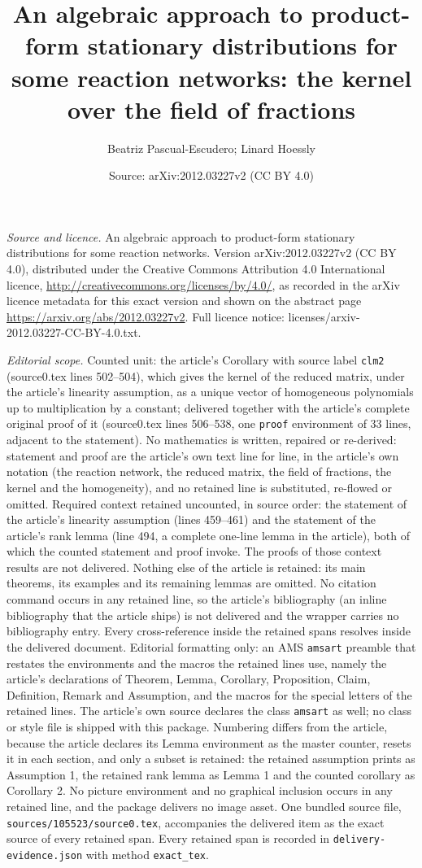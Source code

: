 \documentclass[10pt,a4paper]{amsart}
\title[An algebraic approach to product-form ]{An algebraic approach to product-form stationary distributions for some reaction networks: the kernel over the field of fractions}
\author{Beatriz Pascual-Escudero; Linard Hoessly}
\date{Source: arXiv:2012.03227v2 (CC BY 4.0)}
\theoremstyle{plain}
\theoremstyle{definition}
\theoremstyle{remark}
\begin{document}
\maketitle
\noindent\emph{Source and licence.} An algebraic approach to product-form stationary distributions for some reaction networks. Version arXiv:2012.03227v2 (CC BY 4.0), distributed under the Creative Commons Attribution 4.0 International licence, \url{http://creativecommons.org/licenses/by/4.0/}, as recorded in the arXiv licence metadata for this exact version and shown on the abstract page \url{https://arxiv.org/abs/2012.03227v2}. Full licence notice: licenses/arxiv-2012.03227-CC-BY-4.0.txt.\par\smallskip

\noindent\textit{Editorial scope.} Counted unit: the article's Corollary with source label \texttt{clm2} (source0.tex lines 502--504), which gives the kernel of the reduced matrix, under the article's linearity assumption, as a unique vector of homogeneous polynomials up to multiplication by a constant; delivered together with the article's complete original proof of it (source0.tex lines 506--538, one \texttt{proof} environment of 33 lines, adjacent to the statement). No mathematics is written, repaired or re-derived: statement and proof are the article's own text line for line, in the article's own notation (the reaction network, the reduced matrix, the field of fractions, the kernel and the homogeneity), and no retained line is substituted, re-flowed or omitted. Required context retained uncounted, in source order: the statement of the article's linearity assumption (lines 459--461) and the statement of the article's rank lemma (line 494, a complete one-line lemma in the article), both of which the counted statement and proof invoke. The proofs of those context results are not delivered. Nothing else of the article is retained: its main theorems, its examples and its remaining lemmas are omitted. No citation command occurs in any retained line, so the article's bibliography (an inline bibliography that the article ships) is not delivered and the wrapper carries no bibliography entry. Every cross-reference inside the retained spans resolves inside the delivered document. Editorial formatting only: an AMS \texttt{amsart} preamble that restates the environments and the macros the retained lines use, namely the article's declarations of Theorem, Lemma, Corollary, Proposition, Claim, Definition, Remark and Assumption, and the macros for the special letters of the retained lines. The article's own source declares the class \texttt{amsart} as well; no class or style file is shipped with this package. Numbering differs from the article, because the article declares its Lemma environment as the master counter, resets it in each section, and only a subset is retained: the retained assumption prints as Assumption 1, the retained rank lemma as Lemma 1 and the counted corollary as Corollary 2. No picture environment and no graphical inclusion occurs in any retained line, and the package delivers no image asset. One bundled source file, \texttt{sources/105523/source0.tex}, accompanies the delivered item as the exact source of every retained span. Every retained span is recorded in \texttt{delivery-evidence.json} with method \texttt{exact\_tex}.
\end{document}
